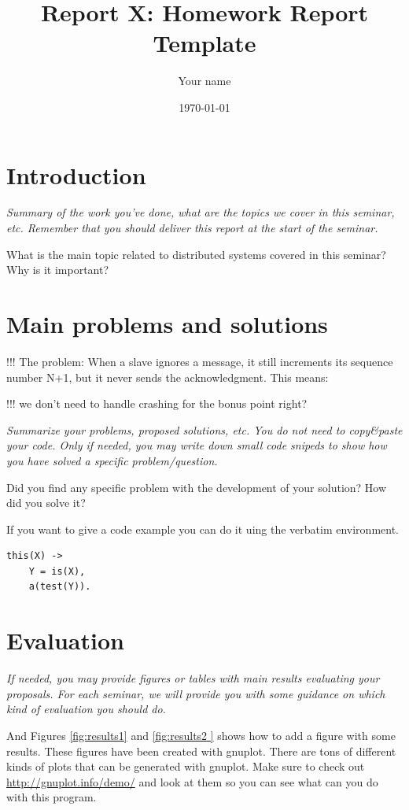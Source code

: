\documentclass[a4paper, 11pt]{article}
\title{Report X: Homework Report Template}
\author{Your name}
\date{\today{}}
\begin{document}
\maketitle

\section{Introduction}

\textit{Summary of the work you've done, what are the topics we cover
  in this seminar, etc. Remember that you should deliver this report
  at the start of the seminar.}

What is the main topic related to distributed systems covered in this seminar?
Why is it important?

\section{Main problems and solutions}


!!!
  The problem: When a slave ignores a message, it still increments its sequence number N+1, but it never sends the acknowledgment. This means:


!!!
  we don't need to handle crashing for the bonus point right?


\textit{Summarize your problems, proposed solutions, etc. You do not
  need to copy\&paste your code. Only if needed, you may write down
  small code snipeds to show how you have solved a specific
  problem/question.}

Did you find any specific problem with the development of your
solution?  How did you solve it?

If you want to give a code example you can do it uing the verbatim environment.
\begin{verbatim}
this(X) ->
    Y = is(X),
    a(test(Y)).
\end{verbatim}

\section{Evaluation}

\textit{If needed, you may provide figures or tables with main results
  evaluating your proposals. For each seminar, we will provide you
  with some guidance on which kind of evaluation you should do.}


And Figures \ref{fig:results1} and \ref{fig:results2 } shows how to
add a figure with some results. These figures have been created with
gnuplot. There are tons of different kinds of plots that can be
generated with gnuplot. Make sure to check out
\url{http://gnuplot.info/demo/} and look at them so you can see what
can you do with this program.
\end{document}
